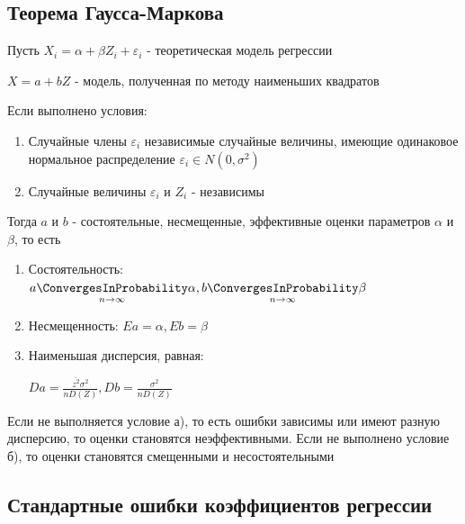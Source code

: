 \subsection{Теорема Гаусса-Маркова}

\hypertarget{gauss_markov_theorem}{}

\begin{MyTheorem}
    \Ths Пусть $X_i = \alpha + \beta Z_i + \varepsilon_i$ - теоретическая модель регрессии

    $X = a + b Z$ - модель, полученная по методу наименьших квадратов

    Если выполнено условия:

    \begin{enumerate}[label=\asbuk*),ref=\asbuk*]
        \item Случайные члены $\varepsilon_i$ независимые случайные величины, имеющие одинаковое нормальное распределение $\varepsilon_i \in N(0, \sigma^2)$
        \item Случайные величины $\varepsilon_i$ и $Z_i$ - независимы
    \end{enumerate}

    Тогда $a$ и $b$ - состоятельные, несмещенные, эффективные оценки параметров $\alpha$ и $\beta$, то есть

    \begin{enumerate}
        \item Состоятельность: $a \underset{n \to \infty}{\ConvergesInProbability} \alpha, b \underset{n \to \infty}{\ConvergesInProbability} \beta$
        \item Несмещенность: $Ea = \alpha, Eb = \beta$
        \item Наименьшая дисперсия, равная:

        $D a = \frac{\overline{z^2} \sigma^2}{n D(Z)}, Db = \frac{\sigma^2}{n D(Z)}$
    \end{enumerate}
\end{MyTheorem}

\Nota Если не выполняется условие а), то есть ошибки зависимы или имеют разную дисперсию, то оценки становятся неэффективными. 
Если не выполнено условие б), то оценки становятся смещенными и несостоятельными

\subsection{Стандартные ошибки коэффициентов регрессии}

\hypertarget{regression_coefficient_error}{}

